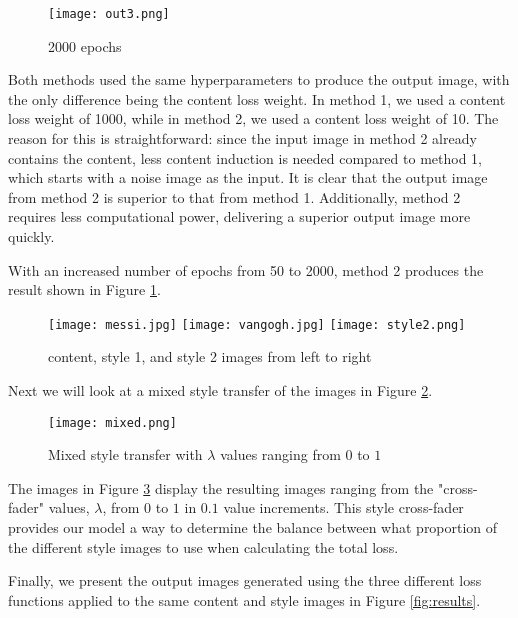 \documentclass[12pt]{article}
\begin{document}
\begin{figure}[h]
    \centering
    \texttt{[image: out3.png]}
    \caption{2000 epochs}
    \label{fig:epoch}
\end{figure}

Both methods used the same hyperparameters to produce the output image, with the
only difference being the content loss weight. In method 1, we used a content
loss weight of 1000, while in method 2, we used a content loss weight of 10. The
reason for this is straightforward: since the input image in method 2 already
contains the content, less content induction is needed compared to method 1,
which starts with a noise image as the input. It is clear that the output image
from method 2 is superior to that from method 1.  Additionally, method 2
requires less computational power, delivering a superior output image more
quickly.

With an increased number of epochs from 50 to 2000, method 2 produces the result shown
in Figure \ref{fig:epoch}.

\begin{figure}[h]
    \centering
    \texttt{[image: messi.jpg]}\hspace{2mm}
    \texttt{[image: vangogh.jpg]}\hspace{2mm}
    \texttt{[image: style2.png]}
    \caption{content, style 1, and style 2 images from left to right}
    \label{fig:mixed}
\end{figure}

Next we will look at a mixed style transfer of the images in Figure
\ref{fig:mixed}.

\begin{figure}[h]
    \centering
    \texttt{[image: mixed.png]}
    \caption{Mixed style transfer with $\lambda$ values ranging from $0$ to $1$}
    \label{fig:cross}
\end{figure}

The images in Figure \ref{fig:cross} display the resulting images ranging from the
"cross-fader" values, $\lambda$, from $0$ to $1$ in $0.1$ value increments. This
style cross-fader provides our model a way to
determine the balance between what proportion of the different style images to
use when calculating the total loss.

Finally, we present the output images generated using the three different loss
functions applied to the same content and style images in Figure
\ref{fig:results}.
\end{document}
